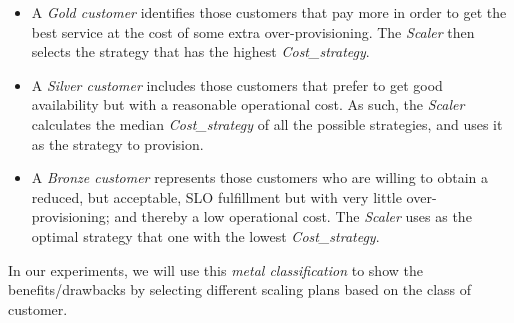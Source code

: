 \begin{itemize}
\item A \emph{Gold customer} identifies those customers that pay more in order to get the best service at the cost of some extra over-provisioning. The \emph{Scaler} then selects the strategy that has the highest \emph{Cost\_strategy}.
\item A \emph{Silver customer} includes those customers that prefer to get good availability but with a reasonable operational cost. As such, the \emph{Scaler} calculates the median \emph{Cost\_strategy} of all the possible strategies, and uses it as the strategy to provision.
\item A  \emph{Bronze customer} represents those customers who are willing to obtain a reduced, but acceptable, SLO fulfillment but with very little over-provisioning; and thereby a low operational cost. The \emph{Scaler} uses as the optimal strategy that one with the lowest \emph{Cost\_strategy}.

\end{itemize}

In our experiments, we will use this \emph{metal classification} to show the benefits/drawbacks by selecting different scaling plans based on the class of customer.






